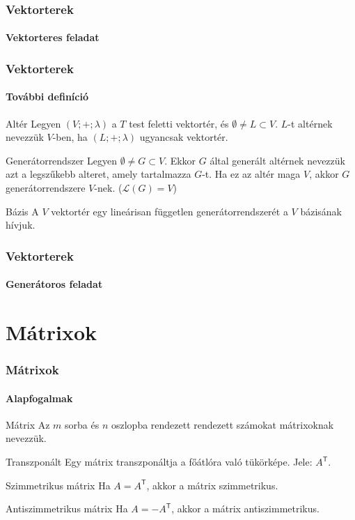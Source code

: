 \documentclass[xcolor={table}]{beamer}
\begin{document}
\begin{frame}
  \frametitle{Vektorterek}
  \framesubtitle{Vektorteres feladat}

  
\end{frame}

\begin{frame}
  \frametitle{Vektorterek}
  \framesubtitle{További definíció}

  \begin{block}{Altér}
    Legyen $(V; +; \lambda)$ a $T$ test feletti vektortér, és
    $\emptyset \neq L \subset V$. $L$-t altérnek nevezzük $V$-ben, ha
    $(L; +; \lambda)$ ugyancsak vektortér.
  \end{block}

  \begin{block}{Generátorrendszer}
    Legyen $\emptyset \neq G \subset V$. Ekkor $G$ által generált altérnek
    nevezzük azt a legszűkebb alteret, amely tartalmazza $G$-t. Ha ez az
    altér maga $V$, akkor $G$ generátorrendszere $V$-nek. ($\mathcal L(G)=V$)
  \end{block}

  \begin{block}{Bázis}
    A $V$ vektortér egy lineárisan független generátorrendszerét a $V$ bázisának
    hívjuk.
  \end{block}
\end{frame}

\begin{frame}
  \frametitle{Vektorterek}
  \framesubtitle{Generátoros feladat}

  
\end{frame}

\section{Mátrixok}
\begin{frame}
  \frametitle{Mátrixok}
  \framesubtitle{Alapfogalmak}

  \vfill

  \begin{block}{Mátrix}
    Az $m$ sorba és $n$ oszlopba rendezett rendezett számokat mátrixoknak
    nevezzük.
  \end{block}

  \vfill

  \begin{block}{Transzponált}
    Egy mátrix transzponáltja a főátlóra való tükörképe. Jele: $A^\mathsf T$.
  \end{block}

  \vfill

  \begin{block}{Szimmetrikus mátrix}
    Ha $A = A^\mathsf T$, akkor a mátrix szimmetrikus.
  \end{block}

  \vfill

  \begin{block}{Antiszimmetrikus mátrix}
    Ha $A = -A^\mathsf T$, akkor a mátrix antiszimmetrikus.
  \end{block}

  \vfill
\end{frame}
\end{document}
